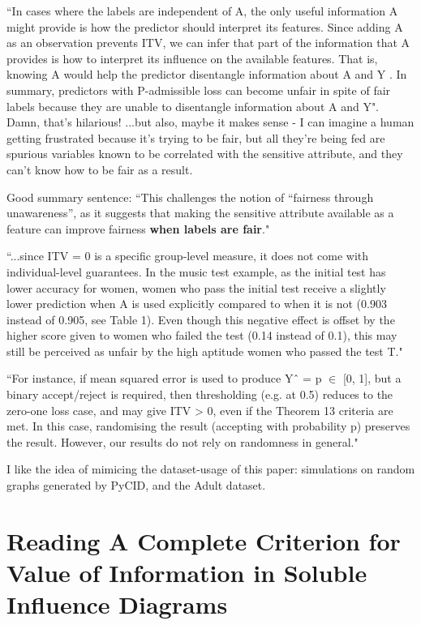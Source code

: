 \documentclass[letterpaper,10pt]{article}
\begin{document}
``In cases where the labels are independent of A, the only useful information A might provide is how the predictor should interpret its features. Since adding A as an observation prevents ITV, we can infer that part of the information that A provides is how to interpret its influence on the available features. That is, knowing A would help the predictor disentangle information about A and Y . In summary, predictors with P-admissible loss can become unfair in spite of fair labels because they are unable to disentangle information about A and Y".
Damn, that's hilarious!
...but also, maybe it makes sense - I can imagine a human getting frustrated because it's trying to be fair, but all they're being fed are spurious variables known to be correlated with the sensitive attribute, and they can't know how to be fair as a result.

Good summary sentence:
``This challenges the notion of “fairness through unawareness”, as it suggests that making the sensitive attribute available as a feature can improve fairness \textbf{when labels are fair}."

``...since ITV = 0 is a specific group-level measure, it does not come with individual-level guarantees. In the music test example, as the initial test has lower accuracy for women, women who pass the initial test receive a slightly lower prediction when A is used explicitly compared to when it is not (0.903 instead of 0.905, see Table 1). Even though this negative effect is offset by the higher score given to women who failed the test (0.14 instead of 0.1), this may still be perceived as unfair by the high aptitude women who passed the test T."

``For instance, if mean squared error is used to produce Yˆ = p $\in$ [0, 1], but a binary accept/reject is required, then thresholding (e.g. at 0.5) reduces to the zero-one loss case, and may give ITV > 0, even if the Theorem 13 criteria are met. In this case, randomising the result (accepting with probability p) preserves the result. However, our results do not rely on randomness in general."

I like the idea of mimicing the dataset-usage of this paper: simulations on random graphs generated by PyCID, and the Adult dataset.

\section{Reading A Complete Criterion for Value of Information in Soluble Influence Diagrams}
\end{document}
